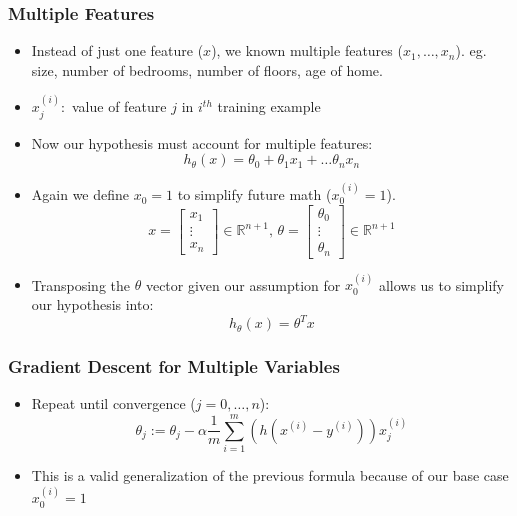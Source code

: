 \subsubsection{Multiple Features}
\begin{itemize}[--]
	\item Instead of just one feature ($x$), we known multiple features ($x_1,\ldots, x_n$). eg. size, number of bedrooms, number of floors, age of home.
	\item $x^{(i)}_j:$ value of feature $j$ in $i^{th}$ training example
	\item Now our hypothesis must account for multiple features: 
		$$h_\theta (x)=\theta_0 + \theta_1 x_1 + \ldots \theta_n x_n$$
	\item Again we define $x_0 = 1$ to simplify future math ($x^{(i)}_0=1$).
	$$x=\begin{bmatrix} x_1\\ \vdots\\ x_n\end{bmatrix}\in \mathbb{R}^{n+1}\text{,  }
		\theta = \begin{bmatrix}\theta_0 \\ \vdots\\ \theta_n\end{bmatrix}\in\mathbb{R}^{n+1}$$
	\item Transposing the $\theta$ vector given our assumption for $x_0^{(i)}$ allows us to simplify our hypothesis into:
		$$h_\theta (x) = \theta^{T}x$$
\end{itemize}

\subsubsection{Gradient Descent for Multiple Variables}
\begin{itemize}[--]
	\item Repeat until convergence ($j=0,\ldots, n$): 
		$$\theta_j := \theta_j -\alpha\frac{1}{m}\sum_{i=1}^{m}(h(x^{(i)}-y^{(i)}))x^{(i)}_j$$
	\item This is a valid generalization of the previous formula because of our base case $x^{(i)}_0=1$
\end{itemize}

